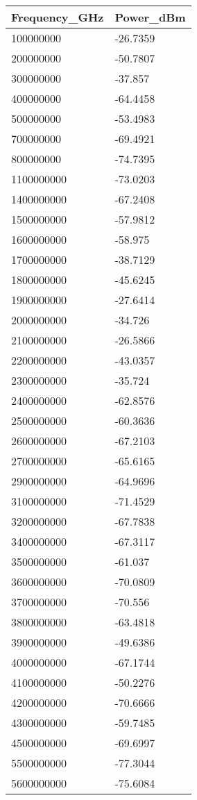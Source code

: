 \begin{tabular}{ll}
Frequency_GHz & Power_dBm \\ 
\hline 
100000000 & -26.7359 \\ 
200000000 & -50.7807 \\ 
300000000 & -37.857 \\ 
400000000 & -64.4458 \\ 
500000000 & -53.4983 \\ 
700000000 & -69.4921 \\ 
800000000 & -74.7395 \\ 
1100000000 & -73.0203 \\ 
1400000000 & -67.2408 \\ 
1500000000 & -57.9812 \\ 
1600000000 & -58.975 \\ 
1700000000 & -38.7129 \\ 
1800000000 & -45.6245 \\ 
1900000000 & -27.6414 \\ 
2000000000 & -34.726 \\ 
2100000000 & -26.5866 \\ 
2200000000 & -43.0357 \\ 
2300000000 & -35.724 \\ 
2400000000 & -62.8576 \\ 
2500000000 & -60.3636 \\ 
2600000000 & -67.2103 \\ 
2700000000 & -65.6165 \\ 
2900000000 & -64.9696 \\ 
3100000000 & -71.4529 \\ 
3200000000 & -67.7838 \\ 
3400000000 & -67.3117 \\ 
3500000000 & -61.037 \\ 
3600000000 & -70.0809 \\ 
3700000000 & -70.556 \\ 
3800000000 & -63.4818 \\ 
3900000000 & -49.6386 \\ 
4000000000 & -67.1744 \\ 
4100000000 & -50.2276 \\ 
4200000000 & -70.6666 \\ 
4300000000 & -59.7485 \\ 
4500000000 & -69.6997 \\ 
5500000000 & -77.3044 \\ 
5600000000 & -75.6084 \\ 

\end{tabular}
